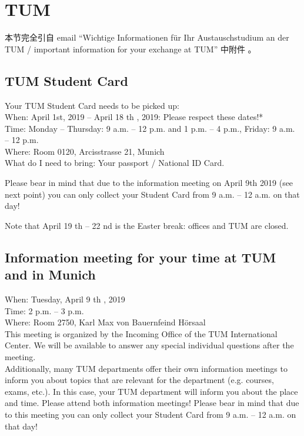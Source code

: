 \documentclass[oneside,final]{book}
\begin{document}
\section{TUM}
本节完全引自 email ``Wichtige Informationen für Ihr Austauschstudium an der TUM / important information for your exchange at TUM'' 中附件 。

\subsection{TUM Student Card}
Your TUM Student Card needs to be picked up: \\
When: April 1st, 2019 -- April 18 th , 2019: Please respect these dates!* \\
Time: Monday -- Thursday: 9 a.m. -- 12 p.m. and 1 p.m. -- 4 p.m., Friday: 9 a.m. -- 12 p.m. \\
Where: Room 0120, Arcisstrasse 21, Munich \\
What do I need to bring: Your passport / National ID Card.

Please bear in mind that due to the information meeting on April 9th 2019 (see next point) you can only collect your Student Card from 9 a.m. -- 12 a.m. on that day!

Note that April 19 th – 22 nd is the Easter break: offices and TUM are closed.


\subsection{Information meeting for your time at TUM and in Munich}
When: Tuesday, April 9 th , 2019 \\
Time: 2 p.m. -- 3 p.m. \\
Where: Room 2750, Karl Max von Bauernfeind Hörsaal \\
This meeting is organized by the Incoming Office of the TUM International Center. We will be available to
answer any special individual questions after the meeting. \\
Additionally, many TUM departments offer their own information meetings to inform you about topics that
are relevant for the department (e.g. courses, exams, etc.). In this case, your TUM department will inform
you about the place and time. Please attend both information meetings!
Please bear in mind that due to this meeting you can only collect your Student Card from
9 a.m. -- 12 a.m. on that day!
\end{document}
